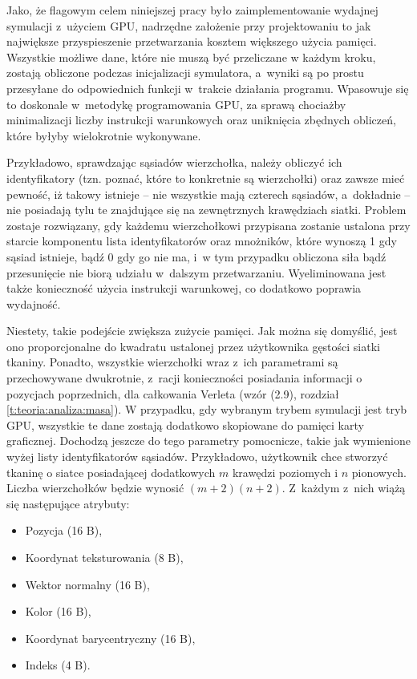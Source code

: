 	Jako, że flagowym celem niniejszej pracy było zaimplementowanie wydajnej symulacji z~użyciem GPU, nadrzędne założenie przy projektowaniu to jak największe przyspieszenie przetwarzania kosztem większego użycia pamięci. Wszystkie możliwe dane, które nie muszą być przeliczane w każdym kroku, zostają obliczone podczas inicjalizacji symulatora, a~wyniki są po prostu przesyłane do odpowiednich funkcji w~trakcie działania programu. Wpasowuje się to doskonale w~metodykę programowania GPU, za sprawą chociażby minimalizacji liczby instrukcji warunkowych oraz uniknięcia zbędnych obliczeń, które byłyby wielokrotnie wykonywane.
	
	Przykładowo, sprawdzając sąsiadów wierzchołka, należy obliczyć ich identyfikatory (tzn. poznać, które to konkretnie są wierzchołki) oraz zawsze mieć pewność, iż takowy istnieje -- nie wszystkie mają czterech sąsiadów, a~dokładnie -- nie posiadają tylu te znajdujące się na zewnętrznych krawędziach siatki. Problem zostaje rozwiązany, gdy każdemu wierzchołkowi przypisana zostanie ustalona przy starcie komponentu lista identyfikatorów oraz mnożników, które wynoszą 1 gdy sąsiad istnieje, bądź 0 gdy go nie ma, i~w tym przypadku obliczona siła bądź przesunięcie nie biorą udziału w~dalszym przetwarzaniu. Wyeliminowana jest także konieczność użycia instrukcji warunkowej, co dodatkowo poprawia wydajność. 
	
	Niestety, takie podejście zwiększa zużycie pamięci. Jak można się domyślić, jest ono proporcjonalne do kwadratu ustalonej przez użytkownika gęstości siatki tkaniny. Ponadto, wszystkie wierzchołki wraz z~ich parametrami są przechowywane dwukrotnie, z~racji konieczności posiadania informacji o pozycjach poprzednich, dla całkowania Verleta (wzór (2.9), rozdział \ref{t:teoria:analiza:masa}). W przypadku, gdy wybranym trybem symulacji jest tryb GPU, wszystkie te dane zostają dodatkowo skopiowane do pamięci karty graficznej. Dochodzą jeszcze do tego parametry pomocnicze, takie jak wymienione wyżej listy identyfikatorów sąsiadów. Przykładowo, użytkownik chce stworzyć tkaninę o siatce posiadającej dodatkowych \(m\) krawędzi poziomych i \(n\) pionowych. Liczba wierzchołków będzie wynosić \( (m + 2)(n + 2) \). Z~każdym z~nich wiążą się następujące atrybuty:
	
	\begin{itemize}
		\item Pozycja (16 B),
		\item Koordynat teksturowania (8 B),
		\item Wektor normalny (16 B),
		\item Kolor (16 B),
		\item Koordynat barycentryczny (16 B),
		\item Indeks (4 B).
	\end{itemize}
	

